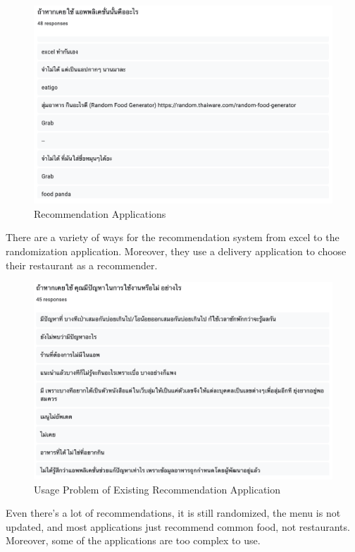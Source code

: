 \documentclass[12pt,oneside,openright,a4paper]{cpe-english-project}
\begin{document}
\begin{figure}[H]\centering
\includegraphics[width=350pt]{./images/A1RecommendationApplications.png}
\caption{Recommendation Applications}\label{fig:A1RecommendationApplications}
\end{figure}

There are a variety of ways for the recommendation system from excel to the randomization application. Moreover, they use a delivery application to choose their restaurant as a recommender.

\begin{figure}[H]\centering
\includegraphics[width=350pt]{./images/A1UsageProblemofExistingRecommendationApplication.png}
\caption{Usage Problem of Existing Recommendation Application}\label{fig:A1UsageProblemofExistingRecommendationApplication}
\end{figure}

Even there’s a lot of recommendations, it is still randomized, the menu is not updated, and most applications just recommend common food, not restaurants. Moreover, some of the applications are too complex to use.
\end{document}
